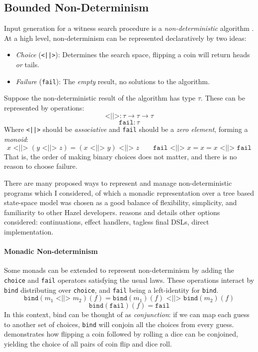 \subsection{Bounded Non-Determinism}\label{sec:Nondeterminism}
Input generation for a witness search procedure \cite{SearchProc} is a \textit{non-deterministic} algorithm \cite{NondeterministicAlgorithms}. At a high level, non-determinism can be represented declaratively by two ideas:
\begin{itemize}
\item \textit{Choice} (\texttt{<||>}): Determines the search space, flipping a coin will return heads \textit{or} tails.
\item \textit{Failure} (\texttt{fail}): The \textit{empty} result, no solutions to the algorithm.
\end{itemize}
Suppose the non-deterministic result of the algorithm has type $\tau$. These can be represented by operations:
\[\texttt{<||>} : \tau \to \tau \to \tau\]
\[\texttt{fail} : \tau\]
Where \texttt{<||>} should be \textit{associative} and \texttt{fail} should be a \textit{zero element}, forming a \textit{monoid}:
\[x \texttt{ <||> } (y \texttt{ <||> } z) = (x \texttt{ <||> } y) \texttt{ <||> } z \qquad \texttt{fail} \texttt{ <||> } x = x = x \texttt{ <||> } \texttt{fail}\]
That is, the order of making binary choices does not matter, and there is no reason to choose failure.

There are many proposed ways to represent and manage non-deterministic programs which I considered, of which a monadic representation over a tree based state-space model was chosen as a good balance of flexibility, simplicity, and familiarity to other Hazel developers.  reasons and details other options considered: continuations, effect handlers, tagless final DSLs, direct implementation.  

\paragraph{Monadic Non-determinism} Some monads can be extended to represent non-determinism by adding the \texttt{choice} and \texttt{fail} operators satisfying the usual laws.
These operations interact by \texttt{bind} distributing over \texttt{choice}, and \texttt{fail} being a left-identity for \texttt{bind}.
\[\texttt{bind}(m_1 \texttt{ <||> } m_2)(f) = \texttt{bind}(m_1)(f) \texttt{ <||> } \texttt{bind}(m_2)(f)\]
\[\texttt{bind}(\texttt{fail})(f) = \texttt{fail}\]
In this context, bind can be thought of as \textit{conjunction}: if we can map each guess to another set of choices, \texttt{bind} will conjoin all the choices from every guess.  demonstrates how flipping a coin followed by rolling a dice can be conjoined, yielding the choice of all pairs of coin flip and dice roll.

